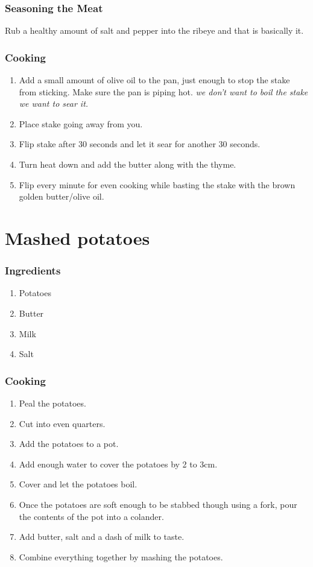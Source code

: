 \subsubsection{Seasoning the Meat}
Rub a healthy amount of salt and pepper into the ribeye and that is basically it.

\subsubsection{Cooking}
\begin{enumerate}
    \item Add a small amount of olive oil to the pan, just enough to stop the stake from sticking. Make sure the pan is piping hot. \textit{we don't want to boil the stake we want to sear it.}
    \item Place stake going away from you.
    \item Flip stake after 30 seconds and let it sear for another 30 seconds.
    \item Turn heat down and add the butter along with the thyme.
    \item Flip every minute for even cooking while basting the stake with the brown golden butter/olive oil.
\end{enumerate}

\section{Mashed potatoes}
\subsubsection{Ingredients}
\begin{enumerate}
    \item Potatoes
    \item Butter
    \item Milk
    \item Salt
\end{enumerate}

\subsubsection{Cooking}
\begin{enumerate}
    \item Peal the potatoes.
    \item Cut into even quarters.
    \item Add the potatoes to a pot.
    \item Add enough water to cover the potatoes by 2 to 3cm.
    \item Cover and let the potatoes boil.
    \item Once the potatoes are soft enough to be stabbed though using a fork, pour the contents of the pot into a colander.
    \item Add butter, salt and a dash of milk to taste.
    \item Combine everything together by mashing the potatoes.
\end{enumerate}


